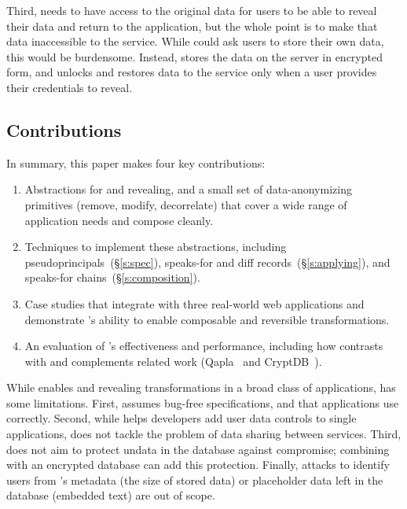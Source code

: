 %
Third, \sys needs to have access to the original data for users to be able to
reveal their data and return to the application, but the whole point
is to make that data inaccessible to the service.
%
While \sys could ask users to store their own \xxed data, this would be burdensome.
%
Instead, \sys stores the \xxed data on the server in encrypted form, and unlocks and
restores data to the service only when a user provides their credentials to
reveal.
%
%
\subsection{Contributions}
%
In summary, this paper makes four key contributions:
\begin{enumerate}[nosep]

    \item Abstractions for \xxing and revealing, and a small set of data-anonymizing primitives (remove, modify, decorrelate) that cover a wide range of application needs and compose cleanly.

    \item Techniques to implement these abstractions, including
        pseudoprincipals~(\S\ref{s:spec}),
        speaks-for and diff records~(\S\ref{s:applying}), and speaks-for
        chains~(\S\ref{s:composition}).

    \item Case studies that integrate \sys with three real-world web
        applications and demonstrate \sys's ability to enable composable and reversible
        transformations.

    \item An evaluation of \sys's effectiveness and performance, including
        how \sys contrasts with and complements related work
        (Qapla~\cite{qapla} and CryptDB~\cite{cryptdb}).
\end{enumerate}
%

%
While \sys enables \xxing and revealing transformations in a broad class of
applications, \sys has some limitations.
%
First, \sys assumes bug-free \xx specifications, and that applications use \sys
correctly.
%
Second, while \sys helps developers add user data controls to single applications,
\sys does not tackle the problem of data sharing between services.
%
Third, \sys does not aim to protect un\xxed data in the database against compromise;
combining \sys with an encrypted database can add this protection.
%
Finally, attacks to identify users from \sys's metadata (\eg the size of
stored \xxed data) or placeholder data left in the database (\eg embedded text)
are out of scope.
%
